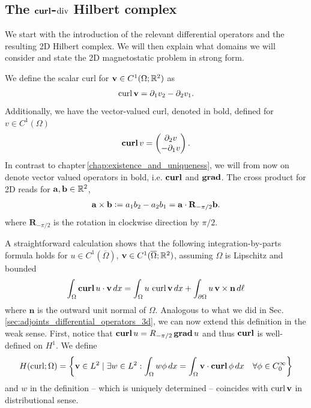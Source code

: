 \documentclass[../master_thesis.tex]{subfiles}
\begin{document}
\subsection{The $\bm{\curl}$-$\diver$ Hilbert complex}\label{sec:variational_formulation_of_the_magnetostatic_problem_in_2D}


We start with the introduction of the relevant differential operators and 
the resulting 2D Hilbert complex. We will then explain what domains we will consider 
and state the 2D magnetostatic problem in strong form.

We define the scalar curl for $\mathbf{v} \in C^1(\Omega;\real^2)$ as
\begin{align*}
    \curl \mathbf{v} = \partial_1 v_2 - \partial_2 v_1.
\end{align*}
Additionally, we have the vector-valued curl, denoted in bold, defined 
for $v \in C^1(\Omega)$
\begin{align*}
    \veccurl v = \begin{pmatrix}\partial_2 v \\ -\partial_1 v    \end{pmatrix}.
\end{align*}
In contrast to chapter\,\ref{chap:existence_and_uniqueness}, we will from now 
on denote vector valued operators in bold, i.e. $\veccurl$ and $\bm{\grad}$.
The cross product for 2D reads for $\mathbf{a}, \mathbf{b} \in \real^2$,
\begin{align*}
    \mathbf{a} \times \mathbf{b} \vcentcolon= a_1 b_2- a_2 b_1 
    = \mathbf{a} \cdot \mathbf{R}_{-\pi/2}\mathbf{b}.
\end{align*}
where $\mathbf{R}_{-\pi/2}$ is the rotation in clockwise direction by $\pi/2$.

A straightforward calculation shows that the following integration-by-parts formula 
holds for $u \in C^1(\overline{\Omega})$, $\mathbf{v} \in C^1(\overline{\Omega};\real^2)$,
assuming $\Omega$ is Lipschitz and bounded
\begin{align}
    \int_\Omega \veccurl u \cdot \mathbf{v} \,dx 
    = \int_\Omega u \, \curl \mathbf{v} \, dx + \int_{\partial \Omega} u\, \mathbf{v} \times \mathbf{n} \, d\ell
    \label{eq:2D_integration_by_parts_curl}
\end{align}
where $\mathbf{n}$ is the outward unit normal of $\Omega$.
Analogous to what we did in Sec.\,\ref{sec:adjoints_differential_operators_3d}, 
we can now extend this definition in the weak sense.
First, notice that $\veccurl u = R_{-\pi/2} \bm{\grad} u$ and thus $\veccurl$ is well-defined 
on $H^1$. We define 
\begin{align*}
    H(\curl;\Omega) = \bigg\{ \mathbf{v} \in L^2 \mid \exists  w \in L^2: 
        \int_\Omega w \phi \, dx = \int_\Omega \mathbf{v} \cdot \veccurl \phi \, dx 
        \quad \forall \phi \in C_0^\infty \bigg\}
\end{align*}
and $w$ in the definition -- which is uniquely determined -- coincides with 
$\curl \mathbf{v}$ in distributional sense. 
\end{document}
